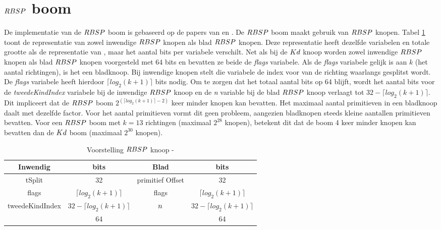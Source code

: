 \section{$\symRBSP$ boom}
\label{sec:h4-rbsp}
De implementatie van de $\symRBSP$ boom is gebaseerd op de papers van \authorKammaje{} \cite{Kammaje} en \authorBudge{} \cite{Budge}.
De $\symRBSP$ boom maakt gebruik van $\symRBSP$ knopen. 
Tabel \ref{tab:voorstelling-rbsp-knoop} toont de representatie van zowel inwendige $\symRBSP$ knopen als blad $\symRBSP$ knopen.
Deze representatie heeft dezelfde variabelen en totale grootte als de representatie van \authorKammaje{} \cite{Kammaje}, maar het aantal bits per variabele verschilt.
Net als bij de $Kd$ knoop worden zowel inwendige $\symRBSP$ knopen als blad $\symRBSP$ knopen voorgesteld met 64 bits en bevatten ze beide de \textit{flags} variabele.
Als de \textit{flags} variabele gelijk is aan $k$ (het aantal richtingen), is het een bladknoop.
Bij inwendige knopen stelt die variabele de index voor van de richting waarlangs gesplitst wordt.
De \textit{flags} variabele heeft hierdoor $\lceil log_2(k+1) \rceil$ bits nodig.
Om te zorgen dat het totaal aantal bits op 64 blijft, wordt het aantal bits voor de \textit{tweedeKindIndex} variabele bij de inwendige $\symRBSP$ knoop en de \textit{n}  variable bij de blad $\symRBSP$ knoop verlaagt tot $32 - \lceil log_2(k+1) \rceil$.
Dit impliceert dat de $\symRBSP$ boom $2^{(\lceil log_2(k+1) \rceil - 2)}$ keer minder knopen kan bevatten.
Het maximaal aantal primitieven in een bladknoop daalt met dezelfde factor.
Voor het aantal primitieven vormt dit geen probleem, aangezien bladknopen steeds kleine aantallen primitieven bevatten.
Voor een $\symRBSP$ boom met $k = 13$ richtingen (maximaal $2^{28}$ knopen), betekent dit dat de boom 4 keer minder knopen kan bevatten dan de $Kd$ boom (maximaal $2^{30}$ knopen). \\
\begin{table}
        \centering
        \begin{tabular}{@{}|c|c|c|c|@{}} \toprule      
        Inwendig & bits & Blad & bits \\ \midrule
        tSplit & 32 & primitief Offset & 32 \\
        flags  & $\lceil log_2(k+1) \rceil$  &  flags   & $\lceil log_2(k+1) \rceil$   \\
        tweedeKindIndex & $32 - \lceil log_2(k+1) \rceil$ & $n$ &  $32 - \lceil log_2(k+1) \rceil$ \\ \hline \hline
        & 64 & & 64    \\ \bottomrule
        \end{tabular}
    \caption[Voorstelling $\symRBSP$ knoop]{Voorstelling $\symRBSP$ knoop - \small }
    \label{tab:voorstelling-rbsp-knoop}    
\end{table}   

